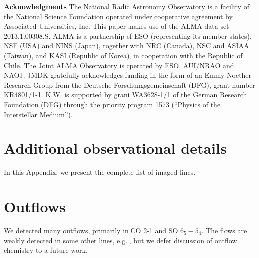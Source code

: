 \documentclass[twocolumn]{aastex61}
\begin{document}
\textbf{Acknowledgments}
The National Radio Astronomy Observatory is a facility of the National Science
Foundation operated under cooperative agreement by Associated Universities,
Inc.
This paper makes use of the ALMA data set 2013.1.00308.S.
ALMA is a partnership of ESO (representing its member states), NSF (USA) and
NINS (Japan), together with NRC (Canada), NSC and ASIAA (Taiwan), and KASI
(Republic of Korea), in cooperation with the Republic of Chile. The Joint ALMA
Observatory is operated by ESO, AUI/NRAO and NAOJ.
JMDK gratefully acknowledges funding in the form of an
Emmy Noether Research Group from the Deutsche Forschungsgemeinschaft (DFG),
grant number KR4801/1-1.
K.W. is supported by grant WA3628-1/1 of the German Research Foundation (DFG)
through the priority program 1573 (``Physics of the Interstellar Medium'').






\appendix

\section{Additional observational details}
In this Appendix, we present the complete list of imaged lines.



%
%
%
%
%
%
%


\section{Outflows}
\label{sec:outflows}
We detected many outflows, primarily in CO 2-1 and SO $6_5-5_4$.  The flows are
weakly detected in some other lines, e.g. \formaldehyde, but we defer
discussion of outflow chemistry to a future work.
\end{document}
